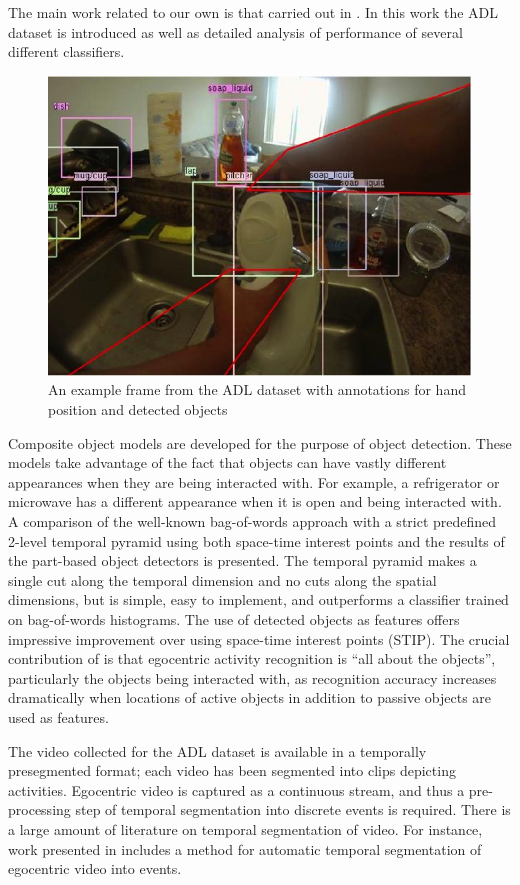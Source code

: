 \documentclass{bmvc2k}
\begin{document}
	The main work related to our own is that carried out in \cite{Ramanan12}. 
	In this work the ADL dataset is introduced as well as detailed analysis of
	performance of several different classifiers. 
	\begin{figure}[t]
		\begin{center}
			  \includegraphics[width=0.7\linewidth]{figures/thumbnail.jpg}
		\end{center}
    \caption{An example frame from the ADL dataset with annotations for hand
    position and detected objects} 
				\label{fig:long}
				\label{fig:onecol}
	\end{figure}
  Composite object models are developed for the purpose of object detection. 
  These models take advantage of the fact that objects can have vastly
  different appearances when they are being interacted with. For example, a
  refrigerator or microwave has a different appearance when it is open and
  being interacted with. 
  A comparison of the well-known bag-of-words approach with a strict
  predefined
  2-level temporal pyramid using both space-time interest points and the
  results of the part-based object detectors is presented. The temporal pyramid makes 
  a single cut along the temporal dimension and no cuts along the
  spatial dimensions, but is simple, easy to implement, and outperforms a 
  classifier trained on bag-of-words histograms. The use of detected objects as
  features offers impressive improvement over using space-time interest points
  (STIP).
	The crucial contribution of
	\cite{Ramanan12} is that egocentric activity recognition is ``all about
	the objects'', particularly the objects being interacted with, as
	recognition accuracy increases dramatically when locations of active
  objects in addition to passive objects are used as features. 

	The video collected for the ADL dataset is available in a temporally
	presegmented format; each video has been segmented into clips depicting
	activities. Egocentric video is captured as a continuous stream, and thus
  a pre-processing step of temporal segmentation into discrete events is
  required. There is a large amount of literature on temporal segmentation
  of video. For instance, work presented in \cite{Lee12} includes a method for
	automatic temporal segmentation of egocentric video into events.
  
\end{document}
